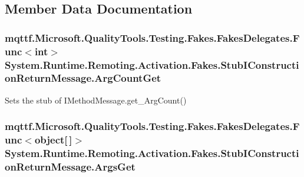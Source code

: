 \subsection{Member Data Documentation}
\hypertarget{class_system_1_1_runtime_1_1_remoting_1_1_activation_1_1_fakes_1_1_stub_i_construction_return_message_a120f979613c10e0b2a8faa56ce710f98}{
\subsubsection[{Arg\-Count\-Get}]{\setlength{\rightskip}{0pt plus 5cm}mqttf.\-Microsoft.\-Quality\-Tools.\-Testing.\-Fakes.\-Fakes\-Delegates.\-Func$<$int$>$ System.\-Runtime.\-Remoting.\-Activation.\-Fakes.\-Stub\-I\-Construction\-Return\-Message.\-Arg\-Count\-Get}}\label{class_system_1_1_runtime_1_1_remoting_1_1_activation_1_1_fakes_1_1_stub_i_construction_return_message_a120f979613c10e0b2a8faa56ce710f98}


Sets the stub of I\-Method\-Message.\-get\-\_\-\-Arg\-Count()

\hypertarget{class_system_1_1_runtime_1_1_remoting_1_1_activation_1_1_fakes_1_1_stub_i_construction_return_message_afadecb9b22dcf41c29f775c133f77d27}{
\subsubsection[{Args\-Get}]{\setlength{\rightskip}{0pt plus 5cm}mqttf.\-Microsoft.\-Quality\-Tools.\-Testing.\-Fakes.\-Fakes\-Delegates.\-Func$<$object\mbox{[}$\,$\mbox{]}$>$ System.\-Runtime.\-Remoting.\-Activation.\-Fakes.\-Stub\-I\-Construction\-Return\-Message.\-Args\-Get}}\label{class_system_1_1_runtime_1_1_remoting_1_1_activation_1_1_fakes_1_1_stub_i_construction_return_message_afadecb9b22dcf41c29f775c133f77d27}


